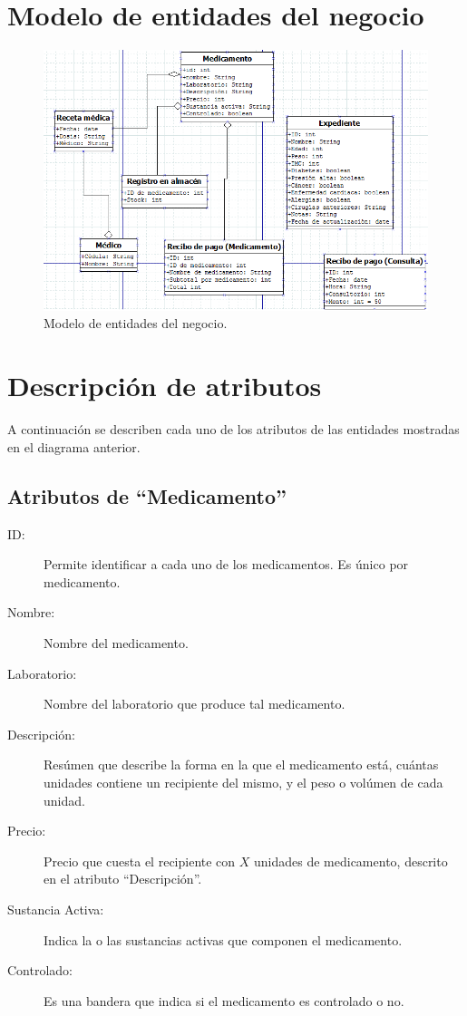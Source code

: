 

\section{Modelo de entidades del negocio}

\begin{figure}[htbp!]
	\centering
		\includegraphics[width=1\textwidth]{images/entidades}
		\caption{Modelo de entidades del negocio.}
	\end{figure}


\section{Descripción de atributos}
A continuaci\'on se describen cada uno de los atributos de las entidades mostradas en el diagrama anterior.

\subsection{Atributos de ``Medicamento''}

\begin{description}
	\item[ID: ] Permite identificar a cada uno de los medicamentos. Es \'unico por medicamento.
	\item[Nombre: ] Nombre del medicamento.
	\item[Laboratorio: ] Nombre del laboratorio que produce tal medicamento.
	\item[Descripci\'on: ] Res\'umen que describe la forma en la que el medicamento est\'a, cu\'antas unidades contiene un recipiente del mismo, y el peso o vol\'umen de cada unidad.
	\item[Precio: ] Precio que cuesta el recipiente con $X$ unidades de medicamento, descrito en el atributo "`Descripci\'on"'.
	\item[Sustancia Activa: ] Indica la o las sustancias activas que componen el medicamento. 
	\item[Controlado: ] Es una bandera que indica si el medicamento es controlado o no.
\end{description}
